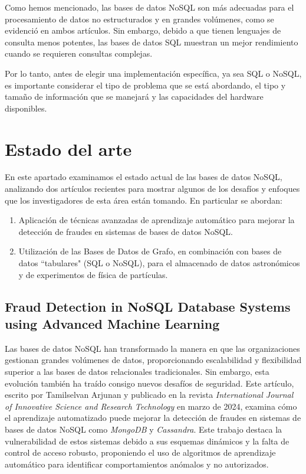 \documentclass[pdflatex,sn-mathphys-num]{sn-jnl}
\theoremstyle{thmstyleone}%
\theoremstyle{thmstyletwo}%
\theoremstyle{thmstylethree}%
\begin{document}
Como hemos mencionado, las bases de datos NoSQL son más adecuadas para el procesamiento de datos no estructurados y en grandes volúmenes, como se evidenció en ambos artículos. Sin embargo, debido a que tienen lenguajes de consulta menos potentes, las bases de datos SQL muestran un mejor rendimiento cuando se requieren consultas complejas.

Por lo tanto, antes de elegir una implementación específica, ya sea SQL o NoSQL, es importante considerar el tipo de problema que se está abordando, el tipo y tamaño de información que se manejará y las capacidades del hardware disponibles.

\section{Estado del arte}\label{sec6}

En este apartado examinamos el estado actual de las bases de datos NoSQL, analizando dos artículos recientes para mostrar algunos de los desafíos y enfoques que los investigadores de esta área están tomando. En particular se abordan:

\begin{enumerate}
    \item Aplicación de técnicas avanzadas de aprendizaje automático para mejorar la detección de fraudes en sistemas de bases de datos NoSQL.
    \item Utilización de las Bases de Datos de Grafo, en combinación con bases de datos ``tabulares" (SQL o NoSQL), para el almacenado de datos astronómicos y de experimentos de física de partículas.
\end{enumerate}

\subsection{Fraud Detection in NoSQL Database Systems
using Advanced Machine Learning}\label{sec61}

Las bases de datos NoSQL han transformado la manera en que las organizaciones gestionan grandes volúmenes de datos, proporcionando escalabilidad y flexibilidad superior a las bases de datos relacionales tradicionales. Sin embargo, esta evolución también ha traído consigo nuevos desafíos de seguridad. Este artículo\cite{fraud_detection}, escrito por Tamilselvan Arjunan y publicado en la revista \textit{International Journal of Innovative Science and Research Technology} en marzo de 2024, examina cómo el aprendizaje automatizado puede mejorar la detección de fraudes en sistemas de bases de datos NoSQL como \textit{MongoDB} y \textit{Cassandra}. Este trabajo destaca la vulnerabilidad de estos sistemas debido a sus esquemas dinámicos y la falta de control de acceso robusto, proponiendo el uso de algoritmos de aprendizaje automático para identificar comportamientos anómalos y no autorizados.
\end{document}

